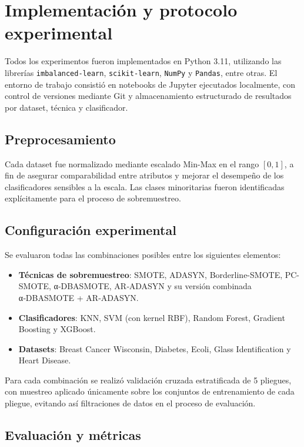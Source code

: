 \section{Implementación y protocolo experimental}

Todos los experimentos fueron implementados en Python 3.11, utilizando las librerías \texttt{imbalanced-learn}, \texttt{scikit-learn}, \texttt{NumPy} y \texttt{Pandas}, entre otras. El entorno de trabajo consistió en notebooks de Jupyter ejecutados localmente, con control de versiones mediante Git y almacenamiento estructurado de resultados por dataset, técnica y clasificador.

\subsection{Preprocesamiento}

Cada dataset fue normalizado mediante escalado Min-Max en el rango $[0, 1]$, a fin de asegurar comparabilidad entre atributos y mejorar el desempeño de los clasificadores sensibles a la escala. Las clases minoritarias fueron identificadas explícitamente para el proceso de sobremuestreo.

\subsection{Configuración experimental}

Se evaluaron todas las combinaciones posibles entre los siguientes elementos:

\begin{itemize}
  \item \textbf{Técnicas de sobremuestreo}: SMOTE, ADASYN, Borderline-SMOTE, PC-SMOTE, α‑DBASMOTE, AR‑ADASYN y su versión combinada α‑DBASMOTE + AR‑ADASYN.
  \item \textbf{Clasificadores}: KNN, SVM (con kernel RBF), Random Forest, Gradient Boosting y XGBoost.
  \item \textbf{Datasets}: Breast Cancer Wisconsin, Diabetes, Ecoli, Glass Identification y Heart Disease.
\end{itemize}

Para cada combinación se realizó validación cruzada estratificada de 5 pliegues, con muestreo aplicado únicamente sobre los conjuntos de entrenamiento de cada pliegue, evitando así filtraciones de datos en el proceso de evaluación.

\subsection{Evaluación y métricas}

